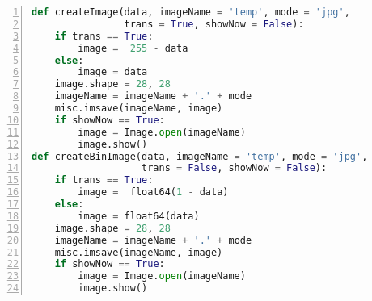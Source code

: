 \begin{lstlisting}[language=Python,numbers=left, frame=shadowbox, rulesepcolor=\color{cadegrey}, caption=\text{MNIST.py}]
def createImage(data, imageName = 'temp', mode = 'jpg', 
                trans = True, showNow = False):
    if trans == True:
        image =  255 - data
    else:
        image = data
    image.shape = 28, 28
    imageName = imageName + '.' + mode
    misc.imsave(imageName, image)
    if showNow == True:    
        image = Image.open(imageName)
        image.show()
def createBinImage(data, imageName = 'temp', mode = 'jpg', 
                   trans = False, showNow = False):
    if trans == True:    
        image =  float64(1 - data)  
    else:
        image = float64(data)
    image.shape = 28, 28
    imageName = imageName + '.' + mode
    misc.imsave(imageName, image)    
    if showNow == True:
        image = Image.open(imageName)
        image.show()
\end{lstlisting}

\newpage

